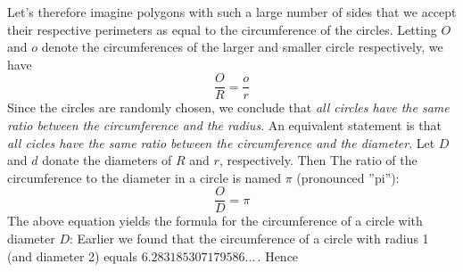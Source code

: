 {Let's therefore imagine polygons with such a large number of sides that we accept their respective perimeters as equal to the circumference of the circles. Letting $ O $ and $ o $ denote the circumferences of the larger and smaller circle respectively, we have
\[ \frac{O}{R}=\frac{o}{r} \]
Since the circles are randomly chosen, we conclude that \textit{all circles have the same ratio between the circumference and the radius}. An equivalent statement is that \textit{all cicles have the same ratio between the circumference and the diameter}. Let $ D $ and $ d $ donate the diameters of $ R $ and $ r $, respectively. Then
The ratio of the circumference to the diameter in a circle is named $ \pi $ \index{$ \pi $}(pronounced ''pi''):
\[ \frac{O}{D}=\pi \]
The above equation yields the formula for the circumference of a circle with diameter $ D $:
Earlier we found that the circumference of a circle with radius 1 (and diameter 2) equals $ 6.283185307179586... $\,. Hence
} \vsk

\vsk

